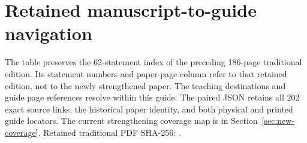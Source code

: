 \section{Retained manuscript-to-guide navigation}\label{sec:crosswalk}
The table preserves the 62-statement index of the preceding 186-page traditional edition. Its statement numbers and paper-page column refer to that retained edition, not to the newly strengthened paper. The teaching destinations and guide page references resolve within this guide. The paired JSON retains all 202 exact source links, the historical paper identity, and both physical and printed guide locators. The current strengthening coverage map is in Section~\ref{sec:new-coverage}.
{\footnotesize Retained traditional PDF SHA-256: .}\par
\begingroup\small
